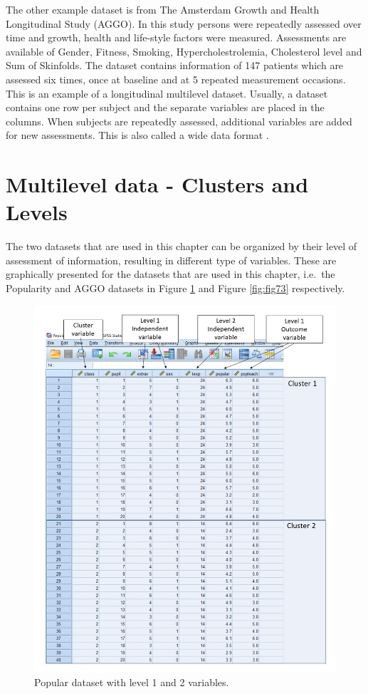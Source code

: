 \documentclass[
]{book}
\begin{document}
The other example dataset is from The Amsterdam Growth and Health Longitudinal Study (AGGO). In this study persons were repeatedly assessed over time and growth, health and life-style factors were measured. Assessments are available of Gender, Fitness, Smoking, Hypercholestrolemia, Cholesterol level and Sum of Skinfolds. The dataset contains information of 147 patients which are assessed six times, once at baseline and at 5 repeated measurement occasions. This is an example of a longitudinal multilevel dataset. Usually, a dataset contains one row per subject and the separate variables are placed in the columns. When subjects are repeatedly assessed, additional variables are added for new assessments. This is also called a wide data format .

\hypertarget{multilevel-data---clusters-and-levels}{%
\section{Multilevel data - Clusters and Levels}\label{multilevel-data---clusters-and-levels}}

The two datasets that are used in this chapter can be organized by their level of assessment of information, resulting in different type of variables. These are graphically presented for the datasets that are used in this chapter, i.e.~the Popularity and AGGO datasets in Figure \ref{fig:fig72} and Figure \ref{fig:fig73} respectively.

\begin{figure}

{\centering \includegraphics[width=0.9\linewidth]{images/fig7.2_2} 

}

\caption{Popular dataset with level 1 and 2 variables.}\label{fig:fig72}
\end{figure}
\end{document}
